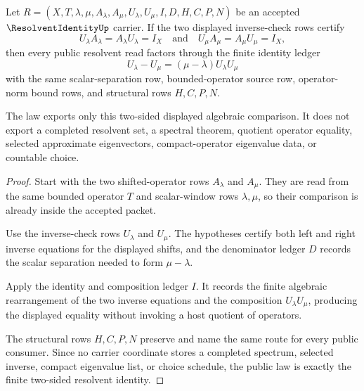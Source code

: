 \begin{theorem}
\label{thm:resolvent-identity-two-sided-law}
Let $R=(X,T,\lambda,\mu,A_\lambda,A_\mu,U_\lambda,U_\mu,I,D,H,C,P,N)$ be an accepted $\ResolventIdentityUp$ carrier. If the two displayed inverse-check rows certify
$$
U_\lambda A_\lambda=A_\lambda U_\lambda=I_X
\quad\text{and}\quad
U_\mu A_\mu=A_\mu U_\mu=I_X,
$$
then every public resolvent read factors through the finite identity ledger
$$
U_\lambda-U_\mu=(\mu-\lambda)U_\lambda U_\mu
$$
with the same scalar-separation row, bounded-operator source row, operator-norm bound rows, and structural rows $H,C,P,N$.

The law exports only this two-sided displayed algebraic comparison. It does not export a completed resolvent set, a spectral theorem, quotient operator equality, selected approximate eigenvectors, compact-operator eigenvalue data, or countable choice.
\end{theorem}
\begin{proof}
Start with the two shifted-operator rows $A_\lambda$ and $A_\mu$. They are read from the same bounded operator $T$ and scalar-window rows $\lambda,\mu$, so their comparison is already inside the accepted packet.

Use the inverse-check rows $U_\lambda$ and $U_\mu$. The hypotheses certify both left and right inverse equations for the displayed shifts, and the denominator ledger $D$ records the scalar separation needed to form $\mu-\lambda$.

Apply the identity and composition ledger $I$. It records the finite algebraic rearrangement of the two inverse equations and the composition $U_\lambda U_\mu$, producing the displayed equality without invoking a host quotient of operators.

The structural rows $H,C,P,N$ preserve and name the same route for every public consumer. Since no carrier coordinate stores a completed spectrum, selected inverse, compact eigenvalue list, or choice schedule, the public law is exactly the finite two-sided resolvent identity.
\end{proof}


